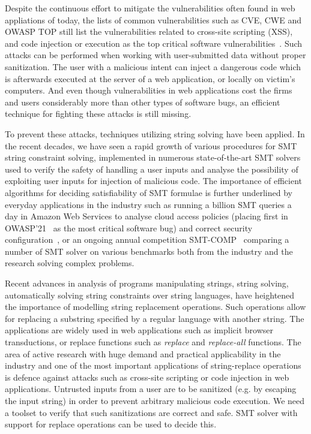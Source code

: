 Despite the continuous effort to mitigate the vulnerabilities often found in web appliations of today, the lists of common vulnerabilities such as CVE, CWE and OWASP TOP still list the vulnerabilities related to cross-site scripting (XSS), and code injection or execution as the top critical software vulnerabilities~\cite{OWASP13,OWASP17,OWASP21,cwe-top-25-2022, cwe-top-25-2023}.
Such attacks can be performed when working with user-submitted data without proper sanitization.
The user with a malicious intent can inject a dangerous code which is afterwards executed at the server of a web application, or locally on victim's computers.
And even though vulnerabilities in web applications cost the firms and users considerably more than other types of software bugs, an efficient technique for fighting these attacks is still missing.

To prevent these attacks, techniques utilizing string solving have been applied.
In the recent decades, we have seen a rapid growth of various procedures for SMT string constraint solving, implemented in numerous state-of-the-art SMT solvers used to verify the safety of handling a user inputs and analyse the possibility of exploiting user inputs for injection of malicious code.
The importance of efficient algorithms for deciding satisfiability of SMT formulae is further underlined by everyday applications in the industry such as running a billion SMT queries a day in Amazon Web Services to analyse cloud access policies (placing first in OWASP'21~\cite{OWASP21} as the most critical software bug) and correct security configuration~\cite{Rungta2022}, or an ongoing annual competition SMT-COMP~\cite{smt_comp} comparing a number of SMT solver on various benchmarks both from the industry and the research solving complex problems.

Recent advances in analysis of programs manipulating strings, string solving, automatically solving string constraints over string languages, have heightened the importance of modelling string replacement operations.
Such operations allow for replacing a substring specified by a regular language with another string.
The applications are widely used in web applications such as implicit browser transductions, or replace functions such as \emph{replace} and \emph{replace-all} functions.
The area of active research with huge demand and practical applicability in the industry and one of the most important applications of string-replace operations is defence against attacks such as cross-site scripting or code injection in web applications.
Untrusted inputs from a user are to be sanitized (e.g. by escaping the input string) in order to prevent arbitrary malicious code execution.
We need a toolset to verify that such sanitizations are correct and safe.
SMT solver with support for replace operations can be used to decide this.

